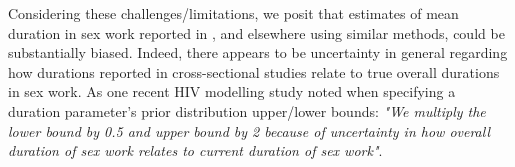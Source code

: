 \begin{table}
  \caption{Methods of estimating mean duration in sex work applied in \citep{Fazito2012}}
  \label{tab:meth}
  
\end{table}
\par
Considering these challenges/limitations,
we posit that estimates of mean duration in sex work
reported in \citep{Fazito2012}, and elsewhere using similar methods,
could be substantially biased.
Indeed, there appears to be uncertainty in general regarding
how durations reported in cross-sectional studies
relate to true overall durations in sex work.
As one recent HIV modelling study noted
when specifying a duration parameter's prior distribution upper/lower bounds:
\emph{"We multiply the lower bound by 0.5 and upper bound by 2
  because of uncertainty in how overall duration of sex work
  relates to current duration of sex work"}.\cite{Stone2021}
